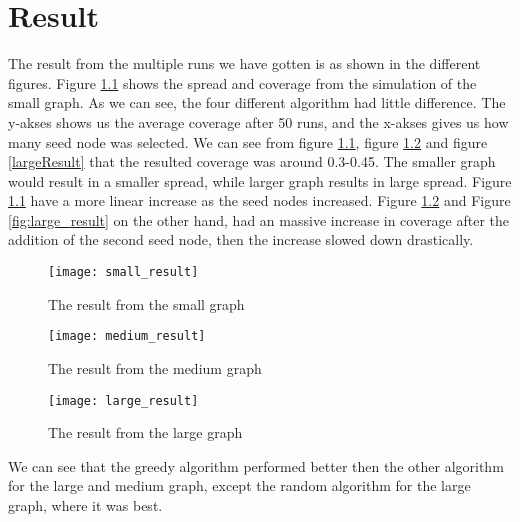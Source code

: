 \chapter{Result}
The result from the multiple runs we have gotten is as shown in the different figures. Figure \ref{fig:smallResult} shows the spread and coverage from the simulation of the small graph. As we can see, the four different algorithm had little difference. The y-akses shows us the average coverage after 50 runs, and the x-akses gives us how many seed node was selected. We can see from figure \ref{fig:smallResult}, figure \ref{fig:mediumResult} and figure \ref{largeResult} that the resulted coverage was around 0.3-0.45. The smaller graph would result in a smaller spread, while larger graph results in large spread. Figure \ref{fig:smallResult} have a more linear increase as the seed nodes increased. Figure \ref{fig:mediumResult} and Figure \ref{fig:large_result} on the other hand, had an massive increase in coverage after the addition of the second seed node, then the increase slowed down drastically. 

\begin{figure}
	\texttt{[image: small\_result]}
	\caption{The result from the small graph} 
	\label{fig:smallResult}
\end{figure}



\begin{figure}
	\texttt{[image: medium\_result]}
	\caption{The result from the medium graph} 
	\label{fig:mediumResult}
\end{figure}



\begin{figure}
	\texttt{[image: large\_result]}
	\caption{The result from the large graph} 
	\label{fig:LargeResult}
\end{figure}

We can see that the greedy algorithm performed better then the other algorithm for the large and medium graph, except the random algorithm for the large graph, where it was best.


